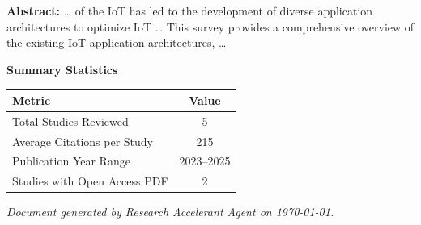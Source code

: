 \documentclass[11pt,a4paper]{article}
\begin{document}
\textbf{Abstract:} … of the IoT has led to the development of diverse application architectures to optimize IoT … This survey provides a comprehensive overview of the existing IoT application architectures, …\par\vspace{0.5em}



\vspace{1em}
\textbf{\large Summary Statistics}\par\vspace{0.5em}

\begin{center}
\begin{tabular}{lc}
\toprule
\textbf{Metric} & \textbf{Value} \\
\midrule
Total Studies Reviewed & 5 \\
Average Citations per Study & 215 \\
Publication Year Range & 2023--2025 \\
Studies with Open Access PDF & 2 \\
\bottomrule
\end{tabular}
\end{center}


\vfill
\begin{center}
\textit{Document generated by Research Accelerant Agent on \today.}
\end{center}
\end{document}
